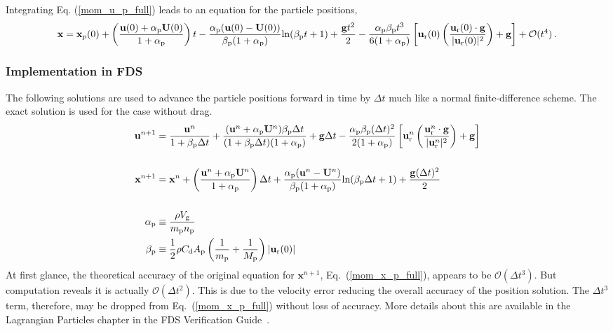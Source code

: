 Integrating Eq. (\ref{mom_u_p_full}) leads to an equation for the particle positions,
\begin{align}
    \label{mom_x_p_full}
    \mathbf{x} = \mathbf{x}_{p}(0) + \left(\frac{\mathbf{u}(0) + \alpha_{\rm p} \mathbf{U}(0)}{1 + \alpha_{\rm p}}\right) t -
\frac{\alpha_{\rm p} (\mathbf{u}(0) - \mathbf{U}(0))}{\beta_{\rm p} (1 + \alpha_{\rm p})} \text{ln}(\beta_{\rm p} t + 1) +
\frac{\mathbf{g} t^2}{2} - \frac{\alpha_{\rm p} \beta_{\rm p} t^3}{6 (1 + \alpha_{\rm p})} \left[\mathbf{u}_{\text{r}}(0)
\left(\frac{\mathbf{u}_{\text{r}}(0) \cdot \mathbf{g}}{|\mathbf{u}_{\text{r}}(0)|^2}\right) + \mathbf{g}\right] + \mathcal{O}(t^4)
\,.
\end{align}

\subsubsection*{Implementation in FDS}

The following solutions are used to advance the particle positions forward in time by $\Delta t$ much like a normal
finite-difference scheme. The exact solution is used for the case without drag.
\begin{align}
    \mathbf{u}^{n+1} &= \frac{\mathbf{u}^n}{1 + \beta_{\rm p} \Delta t} + \frac{(\mathbf{u}^n + \alpha_{\rm p}
\mathbf{U}^n)\beta_{\rm p} \Delta t}{(1 + \beta_{\rm p} \Delta t)(1 + \alpha_{\rm p})} + \mathbf{g} \Delta t - \frac{\alpha_{\rm
p} \beta_{\rm p} (\Delta t)^2}{2 (1 + \alpha_{\rm p})} \left[\mathbf{u}_\text{r}^n \left(\frac{\mathbf{u}_\text{r}^n \cdot
\mathbf{g}}{|\mathbf{u}_\text{r}^n|^2}\right) + \mathbf{g}\right] \\
    & \notag \\
    \mathbf{x}^{n+1} &= \mathbf{x}^n + \left(\frac{\mathbf{u}^n + \alpha_{\rm p} \mathbf{U}^n}{1 + \alpha_{\rm p}}\right) \Delta t
+ \frac{\alpha_{\rm p} (\mathbf{u}^n - \mathbf{U}^n)}{\beta_{\rm p} (1 + \alpha_{\rm p})} \text{ln}(\beta_{\rm p} \Delta t + 1) +
\frac{\mathbf{g} (\Delta t)^2}{2} \\
    & \notag \\
    \alpha_{\rm p} &\equiv \frac{\rho V_{\rm g}}{m_{\rm p} n_{\rm p}} \notag \\
    \beta_{\rm p} &\equiv \frac{1}{2} \rho C_\text{d} A_{\rm p} \left(\frac{1}{m_{\rm p}} + \frac{1}{M_{\rm p}} \right)
|\mathbf{u}_{\text{r}}(0)| \notag
\end{align}
At first glance, the theoretical accuracy of the original equation for $\mathbf{x}^{n+1}$, Eq.~(\ref{mom_x_p_full}), appears to be
$\mathcal{O}(\Delta t^3)$. But computation reveals it is actually $\mathcal{O}(\Delta t^2)$. This is due to the velocity error
reducing the overall accuracy of the position solution. The $\Delta t^3$ term, therefore, may be dropped from
Eq.~(\ref{mom_x_p_full}) without loss of accuracy. More details about this are available in the Lagrangian Particles chapter in
the FDS Verification Guide~\cite{FDS_Verification_Guide}.


